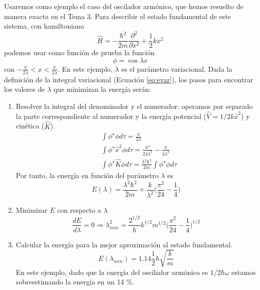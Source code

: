 Usaremos como ejemplo el caso del oscilador armónico, que 
hemos resuelto de manera exacta en el Tema 3. Para describir
el estado fundamental de este sistema, con hamiltoniano
\begin{equation}
    \hat{H}=-\frac{\hbar^2}{2m}\frac{\partial^2}{\partial x^2} + 
    \frac{1}{2}kx^2
\end{equation}
podemos usar como función de prueba la función
\begin{equation}
 \phi=\cos\lambda x   
\end{equation}
con $-\frac{\pi}{2\lambda}<x<\frac{\pi}{2\lambda}$. En
este ejemplo, $\lambda$ es el parámetro variacional. 
Dada la definición de la integral variacional (Ecuación 
\ref{eq:evar}), los pasos para encontrar los valores de 
$\lambda$ que minimizan la energía serán:
\begin{enumerate}
    \item Resolver la integral del denominador y el numerador:
    operamos por separado la parte correspondiente al numerador 
    y la energía potencial ($\hat{V}=1/2k\hat{x}^2$) y cinética 
    ($\hat{K}$).
    \begin{align}
    & \int{\phi^\star\phi d\tau } = \frac{\pi}{2\lambda} \\
    & \int{\phi^\star\hat{x}^2\phi d\tau} =  \frac{\pi^3}{24\lambda^3}-\frac{\pi}{4\lambda^3} \\
    & \int{\phi^\star\hat{K}\phi d\tau}
    =\frac{\lambda^2\hbar^2}{2m}\int{\phi^\star\phi d\tau}
    \end{align}
    Por tanto, la energía en función del parámetro $\lambda$ es
    \begin{equation}
        E(\lambda) = \frac{\lambda^2\hbar^2}{2m} + \frac{k}{\lambda^2}\bigg(\frac{\pi^2}{24}-\frac{1}{4}\bigg)
    \end{equation}

    \item Minimizar $E$ con respecto a $\lambda$
    \begin{equation}
        \frac{dE}{d\lambda} = 0 \Rightarrow 
        \lambda^2_{min}=\frac{2^{1/2}}{\hbar}k^{1/2}m^{1/2}\bigg(\frac{\pi^2}{24}-\frac{1}{4}\bigg)^{1/2}
    \end{equation}
    
    \item Calcular la energía para la mejor aproximación al
    estado fundamental.
    \begin{equation}
        E(\lambda_{min})=1.14\frac{1}{2}\hbar\sqrt{\frac{k}{m}}
    \end{equation}
    En este ejemplo, dado que la energía del oscilador armónico
    es $1/2\hbar\omega$ estamos sobreestimando la energía en un
    14 \%.
\end{enumerate}

